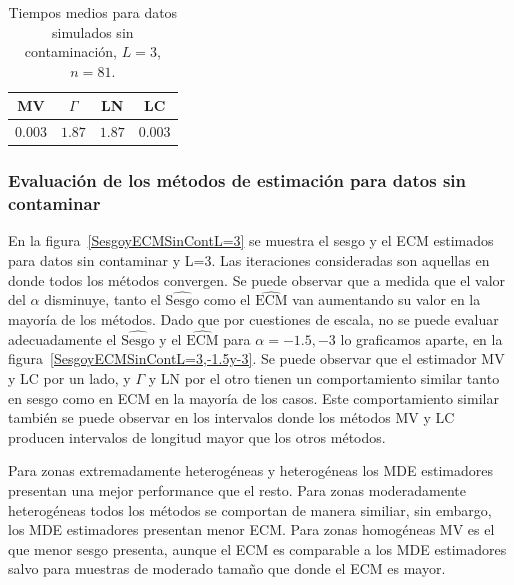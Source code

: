 \begin{table}[htb]
	\centering
	\begin{tabular}{cccc}
		\toprule
		MV& $\Gamma$ & LN & LC \\
		\midrule
		$0.003$& $1.87$ & $1.87$ &$0.003$ \\
		\bottomrule
	\end{tabular}
	\caption{\label{tablaDeTiemposmediosMVyGAyLNyLC}\small Tiempos medios para datos simulados sin contaminación, $L=3$, $n=81$. }
\end{table}

\subsubsection{Evaluación de los métodos de estimación para datos sin contaminar}

En la figura~\ref{SesgoyECMSinContL=3} se muestra el sesgo y el ECM estimados para datos sin contaminar y L=3. Las iteraciones consideradas son aquellas en donde todos los métodos convergen. Se puede observar que  a medida que el valor del $\alpha$ disminuye, tanto el $\widehat{\text{Sesgo}}$ como el $\widehat{\text{ECM}}$ van aumentando su valor en la mayoría de los métodos. Dado que por cuestiones de escala, no se puede evaluar adecuadamente el $\widehat{\text{Sesgo}}$ y el $\widehat{\text{ECM}}$ para $\alpha=-1.5, -3$ lo graficamos aparte, en la figura~\ref{SesgoyECMSinContL=3,-1.5y-3}. Se puede observar que el estimador MV y LC por un lado, y $\Gamma$ y LN por el otro tienen un comportamiento similar tanto en sesgo como en ECM en la mayoría de los casos. Este comportamiento similar también se puede observar en los intervalos donde los métodos MV y LC producen intervalos de longitud mayor que los otros métodos.

 Para zonas extremadamente heterogéneas y heterogéneas los MDE estimadores presentan una mejor performance que el resto. Para zonas moderadamente heterogéneas todos los métodos se comportan de manera similiar, sin embargo, los MDE estimadores presentan menor ECM. Para zonas homogéneas MV es el que menor sesgo presenta, aunque el ECM es comparable a los MDE estimadores salvo para muestras de moderado tamaño que donde el ECM es mayor.


